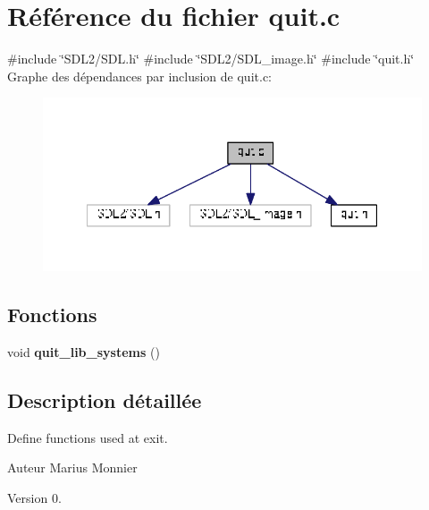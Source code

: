 \section{Référence du fichier quit.\+c}
\label{quit_8c}
{\ttfamily \#include \char`\"{}S\+D\+L2/\+S\+D\+L.\+h\char`\"{}}\newline
{\ttfamily \#include \char`\"{}S\+D\+L2/\+S\+D\+L\+\_\+image.\+h\char`\"{}}\newline
{\ttfamily \#include \char`\"{}quit.\+h\char`\"{}}\newline
Graphe des dépendances par inclusion de quit.\+c\+:
\nopagebreak
\begin{figure}[H]
\begin{center}
\leavevmode
\includegraphics[width=341pt]{quit_8c__incl}
\end{center}
\end{figure}
\subsection*{Fonctions}
\begin{DoxyCompactItemize}
\item 
\mbox{\label{quit_8c_a041c01db677559185eea53ef91f60d1a}} 
void {\bfseries quit\+\_\+lib\+\_\+systems} ()
\end{DoxyCompactItemize}


\subsection{Description détaillée}
Define functions used at exit. 

\begin{DoxyAuthor}{Auteur}
Marius Monnier 
\end{DoxyAuthor}
\begin{DoxyVersion}{Version}
0. 
\end{DoxyVersion}
